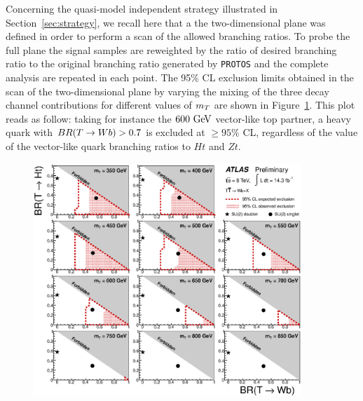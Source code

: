 Concerning the quasi-model independent strategy illustrated in Section~\ref{sec:strategy}, 
we recall here that a the two-dimensional plane was defined in order
to perform a scan of the allowed branching ratios.
To probe the full plane the signal samples are reweighted by the ratio
of desired branching ratio to the original branching ratio generated
by \texttt{PROTOS} and the complete analysis are repeated in each point.
The  95\% CL exclusion limits  obtained in the scan of the two-dimensional
plane by varying the mixing of the three decay channel contributions for
different values of $m_{\T}$ are shown in Figure~\ref{fig:limits2D_wbx}. 
This plot reads as follow: taking for instance the $600\gev$ 
vector-like top partner, a heavy quark with
$BR(\T\to W b)>0.7$ is excluded at $\geq 95\%$ CL, 
regardless of the value of the vector-like quark branching ratios to $Ht$ and $Zt$.  

\begin{figure}[h!bt]
\begin{center}
\includegraphics[width=0.9\textwidth]{results/figures/NewttbarMod/lim_Scan2D_tight_Bin1.eps}
\caption[bla]{
\label{fig:limits2D_wbx}}
\end{center}
\end{figure}



